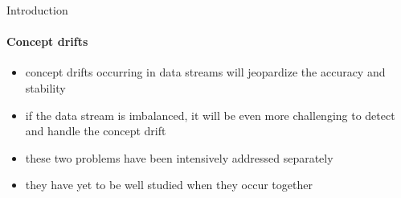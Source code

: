 
\begin{frame}{Introduction}
\framesubtitle{Concept drifts}

\begin{itemize}
    \item concept drifts occurring in data streams will jeopardize the accuracy and stability
    \item if the data stream is imbalanced, it will be even more challenging to detect and handle the concept drift
    \item these two problems have been intensively addressed separately
    \item they have yet to be well studied when they occur together
\end{itemize}

\end{frame}

